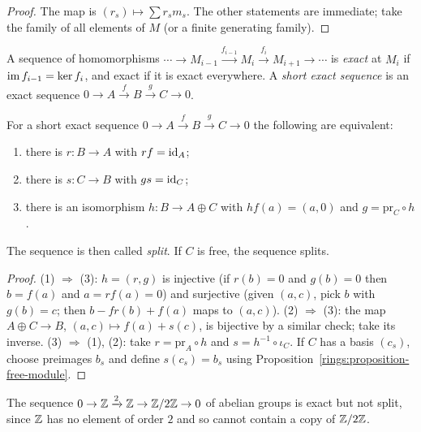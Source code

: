 \begin{proof}
The map is $(r_s) \mapsto \sum r_s m_s$. The other statements are immediate; take the family
of all elements of $M$ (or a finite generating family).
\end{proof}

\begin{definition}\label{rings:definition-exact}
A sequence of homomorphisms $\cdots \to M_{i-1} \xrightarrow{f_{i-1}} M_i \xrightarrow{f_i} M_{i+1} \to \cdots$ is
\emph{exact} at $M_i$ if $\operatorname{im} f_{i-1} = \ker f_i$, and exact if it is exact everywhere. A
\emph{short exact sequence} is an exact sequence $0 \to A \xrightarrow{f} B \xrightarrow{g} C \to 0$.
\end{definition}

\begin{proposition}\label{rings:proposition-splitting}
For a short exact sequence $0 \to A \xrightarrow{f} B \xrightarrow{g} C \to 0$ the following are
equivalent:
\begin{enumerate}
\item there is $r \colon B \to A$ with $rf = \mathrm{id}_A$;
\item there is $s \colon C \to B$ with $gs = \mathrm{id}_C$;
\item there is an isomorphism $h \colon B \to A \oplus C$ with $hf(a) = (a, 0)$ and
$g = \mathrm{pr}_C \circ h$.
\end{enumerate}
The sequence is then called \emph{split}. If $C$ is free, the sequence splits.
\end{proposition}

\begin{proof}
(1) $\Rightarrow$ (3): $h = (r, g)$ is injective (if $r(b) = 0$ and $g(b) = 0$ then
$b = f(a)$ and $a = rf(a) = 0$) and surjective (given $(a, c)$, pick $b$ with $g(b) = c$; then
$b - fr(b) + f(a)$ maps to $(a, c)$). (2) $\Rightarrow$ (3): the map
$A \oplus C \to B$, $(a, c) \mapsto f(a) + s(c)$, is bijective by a similar check; take its
inverse. (3) $\Rightarrow$ (1), (2): take $r = \mathrm{pr}_A \circ h$ and $s = h^{-1} \circ \iota_C$.
If $C$ has a basis $(c_s)$, choose preimages $b_s$ and define $s(c_s) = b_s$ using
Proposition~\ref{rings:proposition-free-module}.
\end{proof}

\begin{counterexample}\label{rings:counterexample-non-split}
The sequence $0 \to \mathbb{Z} \xrightarrow{2} \mathbb{Z} \to \mathbb{Z}/2\mathbb{Z} \to 0$ of abelian groups is exact but not split,
since $\mathbb{Z}$ has no element of order $2$ and so cannot contain a copy of $\mathbb{Z}/2\mathbb{Z}$.
\end{counterexample}

